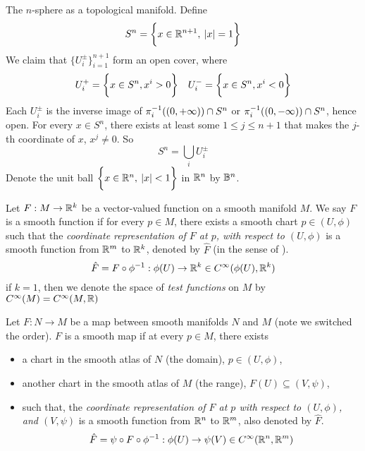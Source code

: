 \documentclass[../main-manifolds.tex]{subfiles}
\begin{document}
\newpage

\begin{example}
    The $n$-sphere as a topological manifold. Define 
\[
    S^n = \biggl\{{x\in\mathbb{R}^{n+1},\: |x|=1}\biggr\}
\]
We claim that $\{U_i^{\pm}\}_{i=1}^{n+1}$ form an open cover, where
\[
    U_i^+ = \biggl\{{x\in S^n, x^i>0}\biggr\}\quad U_i^- = \biggl\{{x\in S^n, x^i<0}\biggr\}
\]
Each $U_i^{\pm}$ is the inverse image of $\pi_{i}^{-1}({(0,+\infty)})\cap S^n$ or $\pi_{i}^{-1}({(0,-\infty)})\cap S^n$, hence open. For every $x\in S^n$, there exists at least some $1\leq j\leq n+1$ that makes the $j$-th coordinate of $x$, $x^j\neq 0$. So 
\[
    S^n = \bigcup_{i}U_i^\pm
\]
Denote the unit ball $\biggl\{{x\in{\mathbb{R}^n},\: |x|<1}\biggr\}$ in ${\mathbb{R}^n}$ by ${\mathbb{B}}^n$. 

\end{example}

\newpage

\newpage


\begin{definition}\label{lee-chp2:test-functions-on-manifolds}
    Let $F: M\to\mathbb{R}^k$ be a vector-valued function on a smooth manifold $M$. We say $F$ is a smooth function if for every $p\in M$, there exists a smooth chart $p\in (U,\phi)$ such that the \emph{coordinate representation of $F$ at $p$, with respect to $(U,\phi)$} is a smooth function from ${\mathbb{R}^m}$ to $\mathbb{R}^k$, denoted by $\hat{F}$ (in the sense of ).
    \[
        \hat{F}=F\circ \phi^{-1}:\phi(U)\to\real^k\in \cinf[\phi(U),\realk]
    \]
    if $k=1$, then we denote the space of \emph{test functions} on $M$ by $\cinf[M]=\cinf[M,\real]$
\end{definition}

\begin{definition}\label{lee-chp2:smooth-maps-between-manifolds-definition}
    Let $F:N\to M$ be a map between smooth manifolds $N$ and $M$ (note we switched the order). $F$ is a smooth map if at every $p\in M$, there exists 
    \begin{itemize}
        \item a chart in the smooth atlas of $N$ (the domain), $p\in (U,\phi)$,
        \item another chart in the smooth atlas of $M$ (the range), $F(U)\subseteq(V,\psi)$,
        \item such that, the \emph{coordinate representation of $F$ at $p$ with respect to $(U,\phi)$, and $(V,\psi)$} is a smooth function from ${\mathbb{R}^n}$ to ${\mathbb{R}^m}$, also denoted by $\hat{F}$.
        \begin{equation}\label{lee-chp2:eq-smooth-map-coordinate-representation}
            \hat{F} = \psi\circ F\circ \phi^{-1}:\phi(U)\to \psi(V)\in \cinf[\realn,\realm]
        \end{equation}
    \end{itemize}
\end{definition}
\end{document}
